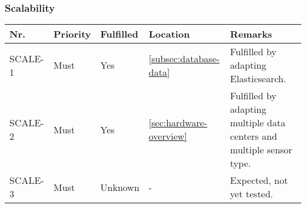 \subsubsection{Scalability}
\begin{table}[H]
	\begin{tabular}{lllll}
						    
		Nr.     & Priority & Fulfilled & Location & Remarks \\ \hline
		SCALE-1 & Must     & Yes      & \ref{subsec:database-data} & Fulfilled by adapting Elasticsearch. \\ 
		SCALE-2 & Must     & Yes      & \ref{sec:hardware-overview} & Fulfilled by adapting multiple data centers and multiple sensor type. \\ 
		SCALE-3 & Must     & Unknown  & -         & Expected, not yet tested. \\
						
	\end{tabular}
\end{table}

\clearpage



